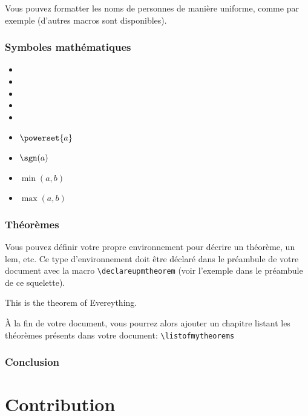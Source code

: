 \documentclass[french]{spimutbmphdthesis}
\begin{document}
Vous pouvez formatter les noms de personnes de manière uniforme, comme par exemple  (d'autres macros sont disponibles).

\section{Symboles mathématiques}

\begin{itemize}
\item \R
\item \N
\item \Z
\item \Q
\item \C
\item $\powerset{a}$
\item $\sgn(a)$
\item $\min(a, b)$
\item $\max(a, b)$
\end{itemize}

\section{Théorèmes}

Vous pouvez définir votre propre environnement pour décrire un théorème, un lem, etc.
Ce type d'environnement doit être déclaré dans le préambule de votre document avec la
macro \texttt{{\textbackslash}declareupmtheorem} (voir l'exemple dans le préambule de
ce squelette).

\begin{mytheorem}
This is the theorem of Evereything.
\end{mytheorem}

\`A la fin de votre document, vous pourrez alors ajouter un chapitre listant les théorèmes présents dans votre document: \texttt{{\textbackslash}listofmytheorems}

\section{Conclusion}
 
 
 
\part{Contribution}
\end{document}

